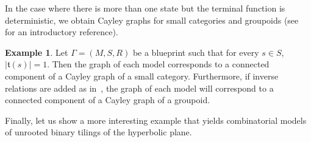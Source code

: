 \documentclass{article}
\theoremstyle{definition}
\newtheorem{example}[theorem]{Example} %
\theoremstyle{definition}
\newcommand{\init}{\mathfrak{i}}
\newcommand{\ter}{\mathfrak{t}}
\begin{document}
In the case where there is more than one state but the terminal function is deterministic, we obtain Cayley graphs for small categories and groupoids (see~\cite{Ibort2019} for an introductory reference).

\begin{example}
    Let $\Gamma = (M,S,R)$ be a blueprint such that for every $s \in S$, $|\ter(s)|=1$. Then the graph of each model corresponds to a connected component of a Cayley graph of a small category. Furthermore, if inverse relations are added as in~, the graph of each model will correspond to a connected component of a Cayley graph of a groupoid.
\end{example}


Finally, let us show a more interesting example that yields combinatorial models of unrooted binary tilings of the hyperbolic plane.
\end{document}
